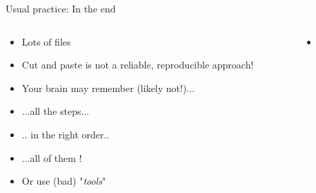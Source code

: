 \documentclass[xcolor=x11names,compress, aspectratio=169]{beamer}
\renewcommand{\(}{\begin{columns}}
\renewcommand{\)}{\end{columns}}
\newcommand{\<}[1]{\begin{column}{#1}}
\renewcommand{\>}{\end{column}}
\begin{document}
\begin{frame}{Usual practice: In the end}

 \begin{columns}[T]
    \begin{column}{0.5\textwidth}
      \begin{itemize}[<+->]
        \item Lots of files
        \item Cut and paste is not a reliable, reproducible approach!
        \item Your brain may remember (likely not!)...
        \item[] ...all the steps...
        \item[] .. in the right order..
        \item[]...all of them !
        \item Or use (bad) "\emph{tools}"
      \end{itemize}
    \end{column}
    \begin{column}{0.5\textwidth}
       \begin{itemize}
       \item[] 

\end{itemize}
\end{column}
\end{columns}
\end{frame}
\end{document}
